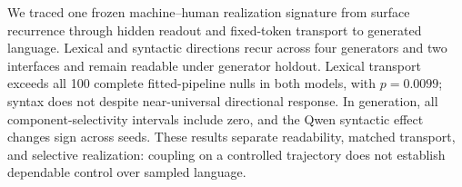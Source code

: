 We traced one frozen machine--human realization signature from surface recurrence through hidden readout and fixed-token transport to generated language. Lexical and syntactic directions recur across four generators and two interfaces and remain readable under generator holdout. Lexical transport exceeds all 100 complete fitted-pipeline nulls in both models, with \(p=0.0099\); syntax does not despite near-universal directional response. In generation, all component-selectivity intervals include zero, and the Qwen syntactic effect changes sign across seeds. These results separate readability, matched transport, and selective realization: coupling on a controlled trajectory does not establish dependable control over sampled language.
